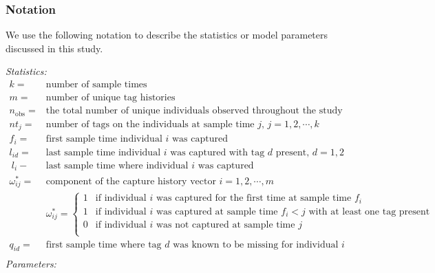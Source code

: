 \documentclass[]{article}
\begin{document}
\subsubsection{Notation}\label{notation}

We use the following notation to describe the statistics or model
parameters discussed in this study.

\emph{Statistics:}\\
\[
  \begin{array}{ll}
      k= & \text{number of sample times} \\
      m= & \text{number of unique tag histories} \\
      n_{\text{obs}}= & \text{the total number of unique individuals observed throughout the study}\\
      nt_j= & \text{number of tags on the individuals at sample time $j$, $j=1,2, \cdots, k$}\\
      f_i= & \text{first sample time individual $i$ was captured}\\
      l_{id}= &\text{last sample time individual $i$ was captured with tag $d$ present, $d=1,2$}\\\
      l_i-&\text{last sample time where individual $i$ was captured}\\
      \omega_{ij}^*= &\text{component of the capture history vector $i=1,2, \cdots, m$}\\
      & \omega_{ij}^* = \left\{\begin{array}{ll}
                          1 & \text{if individual $i$ was captured for the first time at sample time $f_i$} \\
                          1 & \text{if individual $i$ was captured at sample time $f_i<j$ with at least one tag present}\\
                          
                          0 & \text{if individual $i$ was not captured at sample time $j$}\\
                      \end{array}\right. \\
     q_{id}= &\text{first sample time where tag $d$ was known to be missing for individual $i$}\\
  \end{array}
\]
\newpage
\emph{Parameters:}\\
\end{document}
